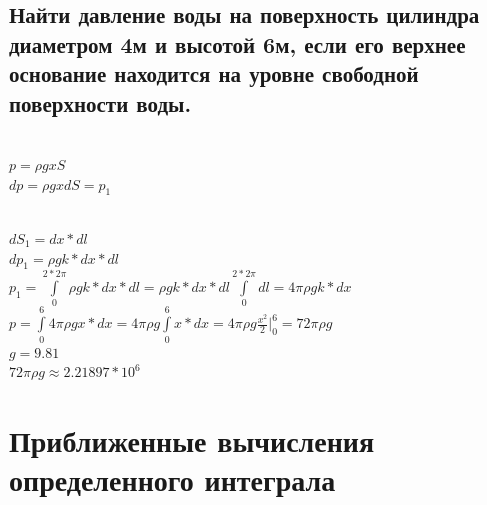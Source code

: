 \documentclass{article}
\begin{document}
\subsection{Найти давление воды на поверхность цилиндра диаметром 4м и высотой 6м, если его верхнее основание находится на уровне свободной поверхности воды.}
\begin{figure}[h!]
\end{figure}
\\
$ p = \rho gxS $\\
$ dp = \rho gxdS = p_1 $\\
\begin{figure}[h!]
\end{figure}\\
$ dS_1 = dx*dl $\\
$ dp_1 = \rho gk*dx*dl $\\
$ p_1 = \int\limits^{2*2\pi}_0 \rho gk*dx*dl = \rho gk*dx*dl \int\limits^{2*2\pi}_0 dl = 4\pi \rho gk*dx $\\
$ p = \int\limits^6_0 4\pi \rho gx*dx = 4\pi \rho g \int\limits^6_0 x*dx = 4\pi \rho g\frac{x^2}{2} |^6_0 = 72\pi \rho g $\\
\small$ g = 9.81 $\\
\normalsize$ 72\pi \rho g \approx 2.21897*10^6$
\newpage
\Large
\section{Приближенные вычисления определенного интеграла}
\normalsize
\end{document}
